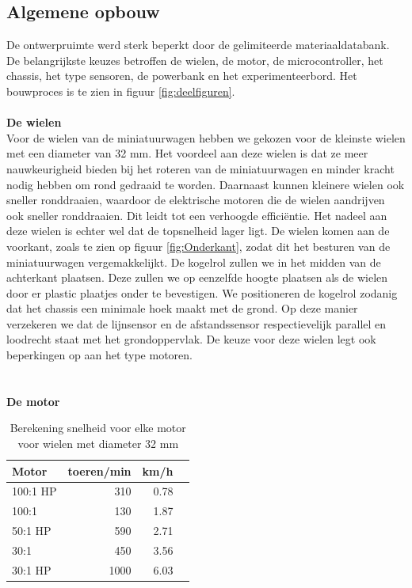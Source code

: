 \documentclass[a4paper,kulak]{kulakarticle}
\begin{document}
\subsection{Algemene opbouw}
De ontwerpruimte werd sterk beperkt door de gelimiteerde materiaaldatabank. De belangrijkste keuzes betroffen de wielen, de motor, de microcontroller, het chassis, het type sensoren, de powerbank en het experimenteerbord. Het bouwproces is te zien in figuur \ref{fig:deelfiguren}.
\\\\ \textbf{\large De wielen} \\
Voor de wielen van de miniatuurwagen hebben we gekozen voor de kleinste wielen met een diameter van 32 mm. Het voordeel aan deze wielen is dat ze meer nauwkeurigheid bieden bij het roteren van de miniatuurwagen en minder kracht nodig hebben om rond gedraaid te worden. Daarnaast kunnen kleinere wielen ook sneller ronddraaien, waardoor de elektrische motoren die de wielen aandrijven ook sneller ronddraaien. Dit leidt tot een verhoogde efficiëntie. Het nadeel aan deze wielen is echter wel dat de topsnelheid lager ligt. De wielen komen aan de voorkant, zoals te zien op figuur \ref{fig:Onderkant}, zodat dit het besturen van de miniatuurwagen vergemakkelijkt. De kogelrol zullen we in het midden van de achterkant plaatsen. Deze zullen we op eenzelfde hoogte plaatsen als de wielen door er plastic plaatjes onder te bevestigen. We positioneren de kogelrol zodanig dat het chassis een minimale hoek maakt met de grond. Op deze manier verzekeren we dat de lijnsensor en de afstandssensor respectievelijk parallel en loodrecht staat met het grondoppervlak. De keuze voor deze wielen legt ook beperkingen op aan het type motoren.\\ \\
\\
\textbf{\large De motor}
\\
\begin{table}
	\centering
	
	\begin{tabular}{|l|r|r|r|}\hline
		  \textbf{Motor}&	\textbf{toeren/min} &	\textbf{km/h}	\\\hline
		100:1 HP&	310&	0.78\\\hline
		100:1&	130&	1.87 	\\\hline
		50:1 HP&	590&	2.71 \\\hline
		30:1&	450&	3.56	\\\hline
		30:1 HP&	1000&	6.03 	\\\hline
	\end{tabular}
	\caption{Berekening snelheid voor elke motor voor wielen met diameter 32 mm}\label{MotorenTab}

\end{table}
\end{document}
